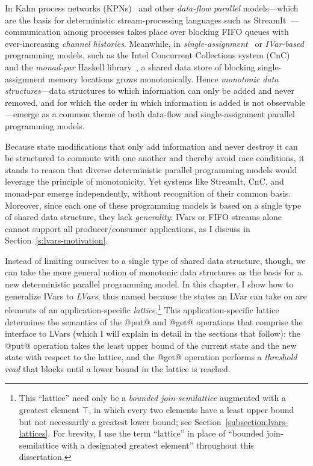 In Kahn process networks (KPNs)~\cite{Kahn-1974} and other
\emph{data-flow parallel} models---which are the basis for
deterministic stream-processing languages such as
StreamIt~\cite{streamit-asplos}---communication among processes takes
place over blocking FIFO queues with ever-increasing \emph{channel
  histories}.  Meanwhile, in
\emph{single-assignment}~\cite{Tesler-1968} or
\emph{IVar-based}~\cite{IStructures} programming models, such as the
Intel Concurrent Collections system (CnC)~\cite{CnC} and the
\emph{monad-par} Haskell library~\cite{monad-par}, a shared data store
of blocking single-assignment memory locations grows monotonically.
Hence \emph{monotonic data structures}---data structures to which
information can only be added and never removed, and for which the
order in which information is added is not observable---emerge as a
common theme of both data-flow and single-assignment parallel
programming models.

Because state modifications that only add information and never
destroy it can be structured to commute with one another and thereby
avoid race conditions, it stands to reason that diverse deterministic
parallel programming models would leverage the principle of
monotonicity.  Yet systems like StreamIt, CnC, and monad-par emerge
independently, without recognition of their common basis.  Moreover,
since each one of these programming models is based on a single type
of shared data structure, they lack \emph{generality}: IVars or FIFO
streams alone cannot support all producer/consumer applications, as I
discuss in Section~\ref{s:lvars-motivation}.

Instead of limiting ourselves to a single type of shared data
structure, though, we can take the more general notion of monotonic
data structures as the basis for a new deterministic parallel
programming model.  In this chapter, I show how to generalize IVars
to \emph{LVars}, thus named because the states an LVar can take on are
elements of an application-specific \emph{lattice}.\footnote{This
``lattice'' need only be a \emph{bounded join-semilattice} augmented
with a greatest element $\top$, in which every two elements have a
least upper bound but not necessarily a greatest lower bound; see
Section~\ref{subsection:lvars-lattices}.  For brevity, I use the term
``lattice'' in place of ``bounded join-semilattice with a designated
greatest element'' throughout this dissertation.}  This
application-specific lattice determines the semantics of the @put@ and
@get@ operations that comprise the interface to LVars (which I will
explain in detail in the sections that follow): the @put@ operation
takes the least upper bound of the current state and the new state
with respect to the lattice, and the @get@ operation performs
a \emph{threshold read} that blocks until a lower bound in the lattice
is reached.

